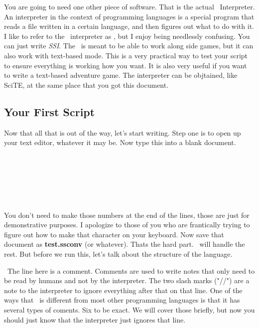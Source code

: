 \documentclass{book}
\begin{document}
You are going to need one other piece of software.  That is the actual \SSquared\ Interpreter.  An interpreter in the context of programming languages is a special program that reads a file written in a certain language, and then figures out what to do with it.  I like to refer to the \SSquared\ interpreter as \SSquaredInterpreter, but I enjoy being needlessly confusing.  You can just write \emph{SSI}.  The \SSquared\ is meant to be able to work along side games, but it can also work with text-based mode.  This is a very practical way to test your script to ensure everything is working how you want.  It is also very useful if you want to write a text-based adventure game.  The interpreter can be objtained, like SciTE, at the same place that you got this document.

\subsection{Your First Script}

Now that all that is out of the way, let's start writing.  Step one is to open up your text editor, whatever it may be.  Now type this into a blank document.  

\begin{SSCodeBox}
  \\
  \\
\scitea{} \\
\scitea{\{}  \\
\scitea{\hspace*{4em}}
\scitea{;}  \\
\scitea{\}}
\end{SSCodeBox}

You don't need to make those numbers at the end of the lines, those are just for demonstrative purposes.  I apologize to those of you who are frantically trying to figure out how to make that character on your keyboard.  Now save that document as \textbf{test.ssconv} (or whatever).  Thats the hard part.  \SSquaredInterpreter\ will handle the rest. But before we run this, let's talk about the structure of the language.  

\ The line here is a comment. Comments are used to write notes that only need to be read by humans and not by the interpreter.  The two slash marks ("//") are a note to the interpreter to ignore everything after that on that line.  One of the ways that \SSquared\ is different from most other programming languages is that it has several types of coments.  Six to be exact.  We will cover those briefly, but now you should just know that the interpreter just ignores that line.
\end{document}
